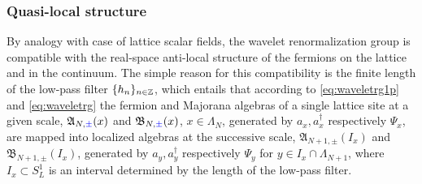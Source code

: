 \documentclass[a4paper, 11pt]{article}
\newcommand{\fA}{\mathfrak{A}}\newcommand{\cA}{\mathcal{A}}\newcommand{\dA}{\mathds{A}}\newcommand{\sA}{\mathscr{A}}
\newcommand{\fB}{\mathfrak{B}}\newcommand{\cB}{\mathcal{B}}\newcommand{\dB}{\mathds{B}}\newcommand{\sB}{\mathscr{B}}
\DeclareMathOperator{\1}{\mathds{1}}
\begin{document}
\subsubsection{Quasi-local structure}
\label{sec:antiloc}
By analogy with case of lattice scalar fields, the wavelet renormalization group is compatible with the real-space anti-local structure of the fermions on the lattice and in the continuum. The simple reason for this compatibility is the finite length of the low-pass filter $\{h_{n}\}_{n\in\mathbb{Z}}$, which entails that according to \eqref{eq:waveletrg1p} and \eqref{eq:waveletrg} the fermion and Majorana algebras of a single lattice site at a given scale, $\fA_{N,{\color{blue}\pm}}(x)$ and $\fB_{N,{\color{blue}\pm}}(x)$, $x\in\Lambda_{N}$, generated by $a_{x}, a^{\dag}_{x}$ respectively $\Psi_{x}$, are mapped into localized algebras at the successive scale, $\fA_{N+1,\pm}(I_{x})$ and $\fB_{N+1,\pm}(I_{x})$, generated by $a_{y}, a^{\dag}_{y}$ respectively $\Psi_{y}$ for $y\in I_{x}\cap\Lambda_{N+1}$, where $I_{x}\subset S^{1}_{L}$ is an interval determined by the length of the low-pass filter. 
\end{document}
